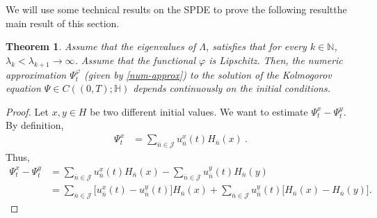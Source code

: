 \documentclass[]{interact}
\newcommand{\IN}{{\mathbb N}}
\theoremstyle{plain}%
\newtheorem{theorem}{Theorem}[section]
\theoremstyle{definition}
\theoremstyle{remark}
\begin{document}
%
        We will use some technical results on the SPDE to prove
        the following result\textemdash the main result of this section.
%
        \begin{theorem}
            \label{thm:ic_continuity}
            Assume that the eigenvalues of $\Lambda$, satisfies that for every 
            $k\in\IN$,
            $\lambda_k<\lambda_{k+1}\rightarrow \infty $. Assume that
            the functional $ \varphi$ is Lipschitz.
            Then, the numeric approximation $\Psi_t^\varphi$ (given by 
            \eqref{num-approx})
            to the solution of the Kolmogorov equation
            ${\Psi\in C((0,T); \mathbb{H})}$ depends continuously on the initial
            conditions.
        \end{theorem}
        \begin{proof}
        Let $x,y\in H$ be two different initial values. We want to estimate
        $\Psi_t^x-\Psi_t^y$. By definition,
        \begin{align}
            \Psi_t^x
                &= \sum_{\bar n\in \mathcal{J}}
                    u_{\bar n} ^ x(t) H_{\bar n}(x) \ .
        \end{align}
        Thus,
        \begin{equation}
            \label{s3.4}
            \begin{aligned}
                \Psi_t^x-\Psi_t^y
                &=
                    \sum_{\bar n\in \mathcal{J}}
                        u_{\bar n}^x(t)H_{\bar n}(x)
                    -
                    \sum_{\bar n\in \mathcal{J}}
                        u_{\bar n}^y(t)H_{\bar n}(y)
               \\
                &=
                    \sum_{\bar n\in \mathcal{J}}
                        \Big[ u_{\bar n}^x(t )- u_{\bar n}^y(t)
                        \Big]H_{\bar n}(x)
                    +
                    \sum_{\bar n\in \mathcal{J}}
                        u_{\bar n}^y(t)
                        \Big[
                            H_{\bar n}(x) - H_{\bar n}(y)
                        \Big].
            \end{aligned}
        \end{equation}
        

\end{proof}
\end{document}
